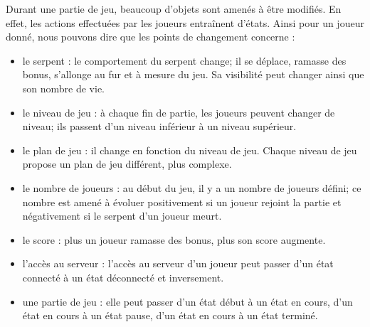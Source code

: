 \par
Durant une partie de jeu, beaucoup d'objets sont amenés à être modifiés. En effet, les actions effectuées par les joueurs entraînent d'états. Ainsi pour un joueur donné, nous pouvons dire que les points de changement concerne : 

\begin{itemize}

	\item le serpent : le comportement du serpent change; il se déplace, ramasse des bonus, s'allonge au fur et à mesure du jeu. Sa visibilité peut changer ainsi que son nombre de vie.
	
	\item le niveau de jeu : à chaque fin de partie, les joueurs peuvent changer de niveau; ils passent d'un niveau inférieur à un niveau supérieur.
	
	\item le plan de jeu : il change en fonction du niveau de jeu. Chaque niveau de jeu propose un plan de jeu différent, plus complexe.
	
	\item le nombre de joueurs : au début du jeu, il y a un nombre de joueurs défini; ce nombre est amené à évoluer positivement si un joueur rejoint la partie et négativement si le serpent d'un joueur meurt.
	
	\item le score : plus un joueur ramasse des bonus, plus son score augmente.
	
	\item l'accès au serveur : l'accès au serveur d'un joueur peut passer d'un état connecté à un état déconnecté et inversement.
	
	\item une partie de jeu : elle peut passer d'un état début à un état en cours, d'un état en cours à un état pause, d'un état en cours à un état terminé.
	
\end{itemize}
